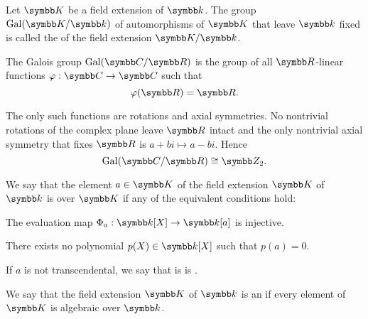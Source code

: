 \begin{definition}\label{def:galois_group}\cite[124]{Knapp2016BAlg}
  Let \( \BK \) be a field extension of \( \Bk \). The group \( \Op{Gal}(\BK / \Bk) \) of automorphisms of \( \BK \) that leave \( \Bk \) fixed is called the  of the field extension \( \BK / \Bk \).
\end{definition}

\begin{example}\label{thm:galois_group_complex_over_real}
  The Galois group \( \Op{Gal}(\BC / \BR) \) is the group of all \( \BR \)-linear functions \( \varphi: \BC \to \BC \) such that
  \begin{equation*}
    \varphi(\BR) = \BR.
  \end{equation*}

  The only such functions are rotations and axial symmetries. No nontrivial rotations of the complex plane leave \( \BR \) intact and the only nontrivial axial symmetry that fixes \( \BR \) is \( a + bi \mapsto a - bi \). Hence
  \begin{equation*}
    \Op{Gal}(\BC / \BR) \cong \BZ_2.
  \end{equation*}
\end{example}

\begin{definition}\label{def:transcendetal_element}\cite[454]{Knapp2016BAlg}
  We say that the element \( a \in \BK \) of the field extension \( \BK \) of \( \Bk \) is  over \( \BK \) if any of the equivalent conditions hold:
  \begin{defenum}
     The evaluation map \( \Phi_a: \Bk[X] \to \Bk[a] \) is injective.

     There exists no polynomial \( p(X) \in \Bk[X] \) such that \( p(a) = 0 \).
  \end{defenum}

  If \( a \) is not transcendental, we say that is is .
\end{definition}

\begin{definition}\label{def:algebraic_extension}\cite[456]{Knapp2016BAlg}
  We say that the field extension \( \BK \) of \( \Bk \) is an  if every element of \( \BK \) is algebraic over \( \Bk \).
\end{definition}

